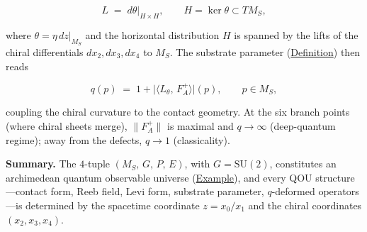 \begin{remark}
\[
L \;=\; d\theta\big|_{H \times H},
  \qquad H = \ker\theta \subset TM_S,
\]

where $\theta = \eta\,dz\big|_{M_S}$ and the horizontal distribution $H$ is
spanned by the lifts of the chiral differentials $dx_2, dx_3, dx_4$ to
$M_S$.  The substrate parameter
(\hyperref[def:substrate-parameter]{Definition}) then reads

\[
q(p) \;=\; 1 + \lvert\langle L_\theta,\, F_A^+ \rangle\rvert(p),
  \qquad p \in M_S,
\]

coupling the chiral curvature to the contact geometry.  At the six branch
points (where chiral sheets merge), $\lVert F_A^+\rVert$ is maximal and
$q \to \infty$ (deep-quantum regime); away from the defects,
$q \to 1$ (classicality).

\textbf{Summary.}
The $4$-tuple $(M_S,\, G,\, P,\, E)$, with $G = \mathrm{SU}(2)$,
constitutes an archimedean quantum observable universe
(\hyperref[ex:brings-surface]{Example}), and every QOU structure---contact
form, Reeb field, Levi form, substrate parameter, $q$-deformed
operators---is determined by the spacetime coordinate $z = x_0/x_1$ and
the chiral coordinates $(x_2, x_3, x_4)$.
\end{remark}

